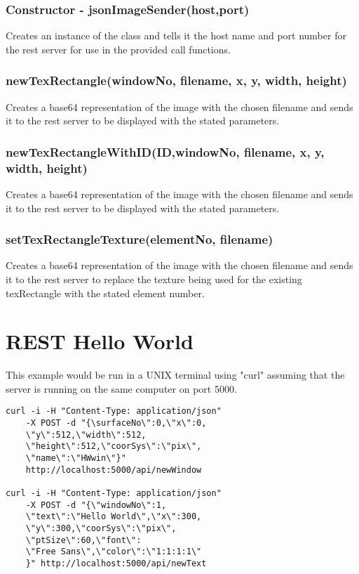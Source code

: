 \documentclass{acm_proc_article-sp}
\begin{document}
\subsubsection{Constructor - jsonImageSender(host,port)}
Creates an instance of the class and tells it the host name and port number for the rest server for use in the provided call functions.
\subsubsection{newTexRectangle(windowNo, filename, x, y, width, height)}
Creates a base64 representation of the image with the chosen filename and sends it to the rest server to be displayed with the stated parameters.
\subsubsection{newTexRectangleWithID(ID,windowNo, filename, x, y, width, height)}
Creates a base64 representation of the image with the chosen filename and sends it to the rest server to be displayed with the stated parameters.
\subsubsection{setTexRectangleTexture(elementNo, filename)}
Creates a base64 representation of the image with the chosen filename and sends it to the rest server to replace the texture being used for the existing texRectangle with the stated element number.


\section{REST Hello World}
This example would be run in a UNIX terminal using "curl" assuming that the server is running on the same computer on port 5000.

\begin{lstlisting}[frame=single]
curl -i -H "Content-Type: application/json" 
	-X POST -d "{\surfaceNo\":0,\"x\":0,
	\"y\":512,\"width\":512,
	\"height\":512,\"coorSys\":\"pix\",
	\"name\":\"HWwin\"}"
	http://localhost:5000/api/newWindow

curl -i -H "Content-Type: application/json" 
	-X POST -d "{\"windowNo\":1,
	\"text\":\"Hello World\",\"x\":300,
	\"y\":300,\"coorSys\":\"pix\",
	\"ptSize\":60,\"font\":
	\"Free Sans\",\"color\":\"1:1:1:1\"
	}" http://localhost:5000/api/newText


\end{lstlisting}
\end{document}
